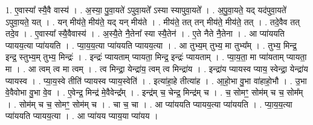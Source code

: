 \documentclass[17pt]{extarticle}
\begin{document}
1. ए॒वास्या᳚ स्यै॒वै वास्य॑ । . अ॒स्या॒ पु॒वा॒यते॑ ऽपुवा॒यते᳚ ऽस्या स्यापुवा॒यते᳚ । . अ॒पु॒वा॒यते॒ यद् यद॑पुवा॒यते॑ ऽपुवा॒यते॒ यत् । . यन् मीय॑ते॒ मीय॑ते॒ यद् यन् मीय॑ते । . मीय॑ते॒ तत् तन् मीय॑ते॒ मीय॑ते॒ तत् । . तदे॒वैव तत् तदे॒व । . ए॒वास्या᳚ स्यै॒वैवास्य॑ । . अ॒स्यै॒ते नै॒तेना᳚ स्या स्यै॒तेन॑ । . ए॒ते नैते नै॒तेना । . आ प्या॑ययति प्यायय॒त्या प्या॑ययति । . प्या॒य॒य॒त्या प्या॑ययति प्यायय॒त्या । . आ तुभ्य॒म् तुभ्य॒ मा तुभ्य᳚म् । . तुभ्य॒ मिन्द्र॒ इन्द्र॒ स्तुभ्य॒म् तुभ्य॒ मिन्द्रः॑ । . इन्द्रः॑ प्यायताम् प्यायता॒ मिन्द्र॒ इन्द्रः॑ प्यायताम् । . प्या॒य॒ता॒ मा प्या॑यताम् प्यायता॒ मा । . आ त्वम् त्व मा त्वम् । . त्व मिन्द्रा॒ येन्द्रा॑य॒ त्वम् त्व मिन्द्रा॑य । . इन्द्रा॑य प्यायस्व प्याय॒ स्वेन्द्रा॒ येन्द्रा॑य प्यायस्व । . प्या॒य॒स्वे तीति॑ प्यायस्व प्याय॒स्वेति॑ । . इत्या॑हा॒हे तीत्या॑ह । . आ॒हो॒भा वु॒भा वा॑हाहो॒भौ । . उ॒भा वे॒वैवोभा वु॒भा वे॒व । . ए॒वेन्द्र॒ मिन्द्र॑ मे॒वैवेन्द्र᳚म् । . इन्द्र॑म् च॒ चेन्द्र॒ मिन्द्र॑म् च । . च॒ सोमꣳ॒॒ सोम॑म् च च॒ सोम᳚म् । . सोम॑म् च च॒ सोमꣳ॒॒ सोम॑म् च । . चा च॒ चा । . आ प्या॑ययति प्यायय॒त्या प्या॑ययति । . प्या॒य॒य॒त्या प्या॑ययति प्यायय॒त्या । . आ प्या॑यय प्याय॒या प्या॑यय । \newline
\end{document}
